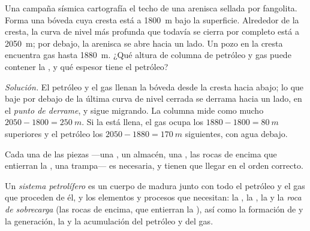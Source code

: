 \begin{example}\label{ex:g11:fossil-fuel-geology:anticline}
Una campaña sísmica cartografía el techo de una arenisca sellada por fangolita.
Forma una bóveda cuya cresta está a \qty{1800}{m} bajo la superficie.
Alrededor de la cresta, la curva de nivel más profunda que todavía se cierra
por completo está a \qty{2050}{m}; por debajo, la arenisca se abre hacia un
lado. Un pozo en la cresta encuentra gas hasta \qty{1880}{m}. ¿Qué altura de
columna de petróleo y gas puede contener la , y qué espesor tiene el
petróleo?

\emph{Solución.} El petróleo y el gas llenan la bóveda desde la cresta hacia
abajo; lo que baje por debajo de la última curva de nivel cerrada se derrama
hacia un lado, en el \emph{punto de derrame}, y sigue migrando. La columna
mide como mucho $2050 - 1800 = \qty{250}{m}$. Si la  está llena, el gas
ocupa los $1880 - 1800 = \qty{80}{m}$ superiores y el petróleo los
$2050 - 1880 = \qty{170}{m}$ siguientes, con agua debajo.
\end{example}

Cada una de las piezas ---una , un almacén, una , las
rocas de encima que entierran la , una trampa--- es necesaria,
y tienen que llegar en el orden correcto.

\begin{definition}\label{def:g11:fossil-fuel-geology:petroleum-system}
Un \emph{sistema petrolífero} es un cuerpo de  madura junto con todo el petróleo y el gas que proceden de él, y
los elementos y procesos que necesitan: la , la ,
la  y la \emph{roca de sobrecarga} (las
rocas de encima, que entierran la ), así como la formación de
 y la generación, la  y la acumulación del petróleo y del gas.
\end{definition}

